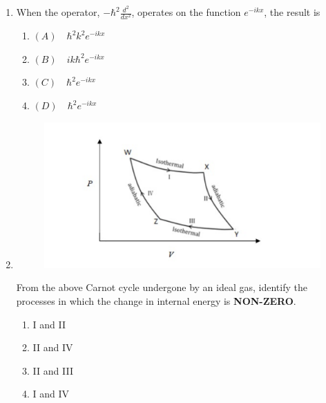 \documentclass[journal,12pt,onecolumn]{exam}
\theoremstyle{remark}
\newcommand{\correct}{\textcolor{correctgreen}{\checkmark}}
\newcommand{\wrong}{\textcolor{wrongred}{\ding{55}}} %
\begin{document}
\begin{enumerate}
 



\item 

When the operator, $-\hbar^{2} \frac{d^2}{dx^2}$, operates on the function $e^{-ikx}$, the result is

\hfill{}

 

\begin{multicols}{2}
\begin{enumerate}
    \item \textcolor{green}{\correct} $(A) \quad \hbar^2 k^2 e^{-ikx}$
    \item \textcolor{red}{\wrong} $(B) \quad ik \hbar^2 e^{-ikx}$
    \item \textcolor{red}{\wrong} $(C) \quad \hbar^2 e^{-ikx}$
    \item \textcolor{red}{\wrong} $(D) \quad \hbar^2 e^{-ikx}$
\end{enumerate}
\end{multicols}

 


\item 

\begin{figure}
    \centering
    \includegraphics[width=\textwidth]{figs/image2.png}
    \caption{}
    \label{fig:figure2}
\end{figure}

From the above Carnot cycle undergone by an ideal gas, identify the processes in which the change in internal energy is \textbf{NON-ZERO}.

\hfill{}

 

\begin{multicols}{2}
\begin{enumerate}
    \item \textcolor{red}{} I and II
    \item \textcolor{green}{\checkmark} II and IV
    \item \textcolor{red}{} II and III
    \item \textcolor{red}{} I and IV
\end{enumerate}
\end{multicols}


\end{enumerate}
\end{document}
